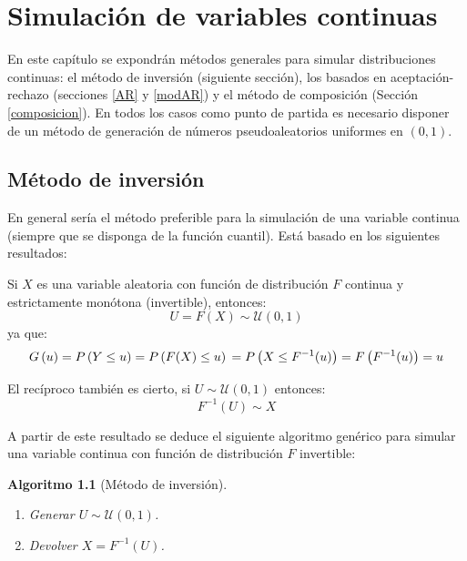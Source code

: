 \documentclass[
]{book}
\theoremstyle{break}
\newtheorem{conjecture}{Algoritmo}[chapter]
\theoremstyle{nonumberplain}
\begin{document}
\hypertarget{continuas}{%
\chapter{Simulación de variables continuas}\label{continuas}}

En este capítulo se expondrán métodos generales para simular distribuciones continuas: el método de inversión (siguiente sección), los basados en aceptación-rechazo (secciones \ref{AR} y \ref{modAR}) y el método de composición (Sección \ref{composicion}).
En todos los casos como punto de partida es necesario disponer de un método de generación de números pseudoaleatorios uniformes en \((0,1)\).

\hypertarget{inversion}{%
\section{Método de inversión}\label{inversion}}

En general sería el método preferible para la simulación de una variable continua (siempre que se disponga de la función cuantil).
Está basado en los siguientes resultados:

Si \(X\) es una variable aleatoria con función de distribución \(F\) continua y estrictamente monótona (invertible), entonces:
\[U = F\left( X \right) \sim \mathcal{U}(0, 1)\]
ya que:
\[G\left( u \right) = P\left( Y \leq u \right) 
= P\left( F(X) \leq u \right) \\
= P\left( X \leq F^{-1}(u) \right) 
= F\left( F^{-1}(u) \right) = u\]

El recíproco también es cierto, si \(U \sim \mathcal{U}(0, 1)\) entonces:
\[F^{-1}\left( U \right) \sim X\]

A partir de este resultado se deduce el siguiente algoritmo genérico para simular una variable continua con función de distribución \(F\) invertible:

\begin{conjecture}[Método de inversión]
\protect\hypertarget{cnj:inversion}{}\label{cnj:inversion}

\begin{enumerate}
\def\labelenumi{\arabic{enumi}.}
\item
  Generar \(U \sim \mathcal{U}(0, 1)\).
\item
  Devolver \(X = F^{-1}\left( U \right)\).
\end{enumerate}

\end{conjecture}
\end{document}
